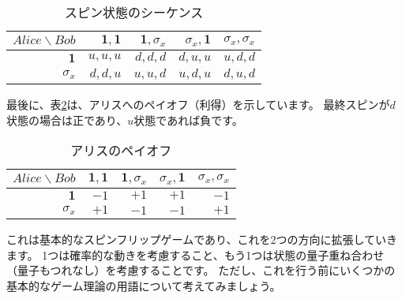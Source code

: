 \begin{table}[H]
\caption{スピン状態のシーケンス}
\label{tab:spin_flip:spin_seq}
\centering
  \begin{tabular}{|r||r|r|r|r|} \hline
    $Alice \backslash Bob$ & $\mathbf{1}, \mathbf{1}$  &  $\mathbf{1}, \sigma_x $  & $ \sigma_x,\mathbf{1} $ & $\sigma_x, \sigma_x $  \\ \hline \hline
    $\mathbf{1}$ & $u,u,u$ & $d,d,d$ & $d,u,u$ & $u,d,d$ \\
    $\sigma_x$   & $d,d,u$ & $u,u,d$ & $u,d,u$ & $d,u,d$ \\ \hline
  \end{tabular}
\end{table}

最後に、表\ref{tab:spin_flip:alice_payoff}は、アリスへのペイオフ（利得）を示しています。
最終スピンが$d$状態の場合は正であり、$u$状態であれば負です。

\begin{table}[H]
\caption{アリスのペイオフ}
\label{tab:spin_flip:alice_payoff}
\centering
  \begin{tabular}{|r||r|r|r|r|} \hline
    $Alice \backslash Bob$ & $\mathbf{1}, \mathbf{1}$  &  $\mathbf{1}, \sigma_x $  & $ \sigma_x,\mathbf{1} $ & $\sigma_x, \sigma_x $  \\ \hline \hline
    $\mathbf{1}$ & $-1$ & $+1$ & $+1$ & $-1$ \\
    $\sigma_x$   & $+1$ & $-1$ & $-1$ & $+1$ \\ \hline
  \end{tabular}
\end{table}


これは基本的なスピンフリップゲームであり、これを2つの方向に拡張していきます。
1つは確率的な動きを考慮すること、もう1つは状態の量子重ね合わせ（量子もつれなし）を考慮することです。
ただし、これを行う前にいくつかの基本的なゲーム理論の用語について考えてみましょう。
